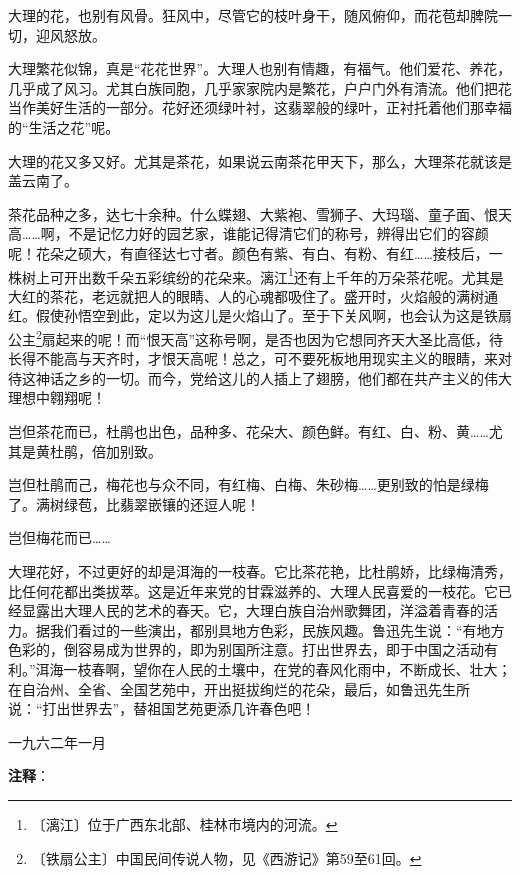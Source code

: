 \documentclass[12pt,UTF-8,openany]{ctexbook}
\begin{document}
\begin{normalsize}
    大理的花，也别有风骨。狂风中，尽管它的枝叶身干，随风俯仰，而花苞却脾院一切，迎风怒放。
    
    大理繁花似锦，真是“花花世界”。大理人也别有情趣，有福气。他们爱花、养花，几乎成了风习。尤其白族同胞，几乎家家院内是繁花，户户门外有清流。他们把花当作美好生活的一部分。花好还须绿叶衬，这翡翠般的绿叶，正衬托着他们那幸福的“生活之花”呢。
    
    大理的花又多又好。尤其是茶花，如果说云南茶花甲天下，那么，大理茶花就该是盖云南了。
    
    茶花品种之多，达七十余种。什么蝶翅、大紫袍、雪狮子、大玛瑙、童子面、恨天高……啊，不是记忆力好的园艺家，谁能记得清它们的称号，辨得出它们的容颜呢！花朵之硕大，有直径达七寸者。颜色有紫、有白、有粉、有红……接枝后，一株树上可开出数千朵五彩缤纷的花朵来。漓江\footnote{〔漓江〕位于广西东北部、桂林市境内的河流。}还有上千年的万朵茶花呢。尤其是大红的茶花，老远就把人的眼睛、人的心魂都吸住了。盛开时，火焰般的满树通红。假使孙悟空到此，定以为这儿是火焰山了。至于下关风啊，也会认为这是铁扇公主\footnote{〔铁扇公主〕中国民间传说人物，见《西游记》第59至61回。}扇起来的呢！而“恨天高”这称号啊，是否也因为它想同齐天大圣比高低，待长得不能高与天齐时，才恨天高呢！总之，可不要死板地用现实主义的眼睛，来对待这神话之乡的一切。而今，党给这儿的人插上了翅膀，他们都在共产主义的伟大理想中翱翔呢！
    
    岂但茶花而已，杜鹃也出色，品种多、花朵大、颜色鲜。有红、白、粉、黄……尤其是黄杜鹃，倍加别致。
    
    岂但杜鹃而己，梅花也与众不同，有红梅、白梅、朱砂梅……更别致的怕是绿梅了。满树绿苞，比翡翠嵌镶的还逗人呢！
    
    岂但梅花而已……
    
    大理花好，不过更好的却是洱海的一枝春。它比茶花艳，比杜鹃娇，比绿梅清秀，比任何花都出类拔萃。这是近年来党的甘霖滋养的、大理人民喜爱的一枝花。它已经显露出大理人民的艺术的春天。它，大理白族自治州歌舞团，洋溢着青春的活力。据我们看过的一些演出，都别具地方色彩，民族风趣。鲁迅先生说：“有地方色彩的，倒容易成为世界的，即为别国所注意。打出世界去，即于中国之活动有利。”洱海一枝春啊，望你在人民的土壤中，在党的春风化雨中，不断成长、壮大；在自治州、全省、全国艺苑中，开出挺拔绚烂的花朵，最后，如鲁迅先生所说：“打出世界去”，替祖国艺苑更添几许春色吧！
    
    \hfill 一九六二年一月
    
\end{normalsize}


\newpage

\textbf{注释}：

\vspace{-1em}
\end{document}

